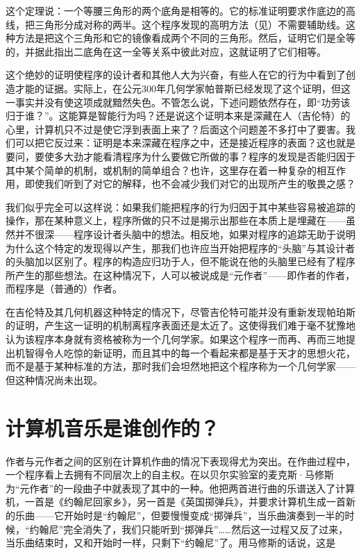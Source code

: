 这个定理说：一个等腰三角形的两个底角是相等的。它的标准证明要求作底边的高线，把三角形分成对称的两半。这个程序发现的高明方法（见）不需要辅助线。这种方法是把这个三角形和它的镜像看成两个不同的三角形。然后，证明它们是全等的，并据此指出二底角在这一全等关系中彼此对应，这就证明了它们相等。

这个绝妙的证明使程序的设计者和其他人大为兴奋，有些人在它的行为中看到了创造才能的证据。实际上，在公元300年几何学家帕普斯已经发现了这个证明，但这一事实并没有使这项成就黯然失色。不管怎么说，下述问题依然存在，即“功劳该归于谁？”。这能算是智能行为吗？还是说这个证明本来是深藏在人（吉伦特）的心里，计算机只不过是使它浮到表面上来了？后面这个问题差不多打中了要害。我们可以把它反过来：证明是本来深藏在程序之中，还是接近程序的表面？这也就是要问，要使多大劲才能看清程序为什么要做它所做的事？程序的发现是否能归因于其中某个简单的机制，或机制的简单组合？也许，这里存在着一种复杂的相互作用，即使我们听到了对它的解释，也不会减少我们对它的出现所产生的敬畏之感？

我们似乎完全可以这样说：如果我们能把程序的行为归因于其中某些容易被追踪的操作，那在某种意义上，程序所做的只不过是揭示出那些在本质上是埋藏在——虽然并不很深——程序设计者头脑中的想法。相反地，如果对程序的追踪无助于说明为什么这个特定的发现得以产生，那我们也许应当开始把程序的“头脑”与其设计者的头脑加以区别了。程序的构造应归功于人，但不能说在他的头脑里已经有了程序所产生的那些想法。在这种情况下，人可以被说成是“元作者”——即作者的作者，而程序是（普通的）作者。

在吉伦特及其几何机器这种特定的情况下，尽管吉伦特可能并没有重新发现帕珀斯的证明，产生这一证明的机制离程序表面还是太近了。这使得我们难于毫不犹豫地认为该程序本身就有资格被称为一个几何学家。如果这个程序一而再、再而三地提出机智得令人吃惊的新证明，而且其中的每一个看起来都是基于天才的思想火花，而不是基于某种标准的方法，那时我们会坦然地把这个程序称为一个几何学家——但这种情况尚未出现。

\section{计算机音乐是谁创作的？}

作者与元作者之间的区别在计算机作曲的情况下表现得尤为突出。在作曲过程中，一个程序看上去拥有不同层次上的自主权。在以贝尔实验室的麦克斯·马修斯为“元作者”的一段曲子中就表现了其中的一种。他把两首进行曲的乐谱送入了计算机，一首是《约翰尼回家乡》，另一首是《英国掷弹兵》，并要求计算机生成一首新的乐曲——它开始时是“约翰尼”，但要慢慢变成“掷弹兵”，当乐曲演奏到一半的时候，“约翰尼”完全消失了，我们只能听到“掷弹兵”……然后这一过程又反了过来，当乐曲结束时，又和开始时一样，只剩下“约翰尼”了。用马修斯的话说，这是

